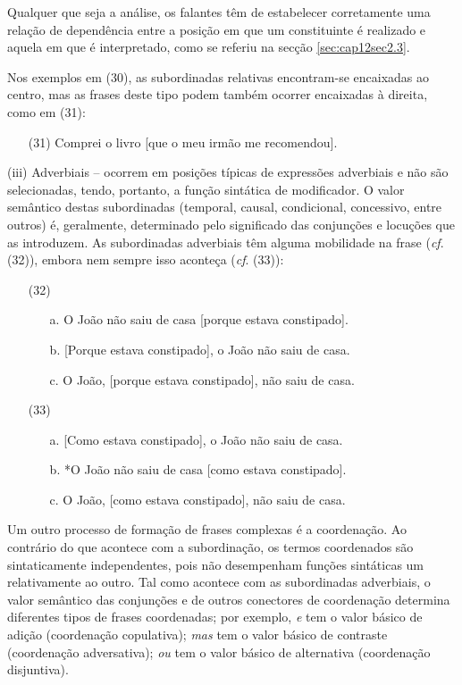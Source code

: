 \documentclass[output=paper,colorlinks,citecolor=brown,booklanguage=portuguese]{langscibook}
\begin{document}
Qualquer que seja a análise, os falantes têm de estabelecer corretamente uma relação de dependência entre a posição em que um constituinte é realizado e aquela em que é interpretado, como se referiu na secção \ref{sec:cap12sec2.3}. 

Nos exemplos em (30), as subordinadas relativas encontram-se encaixadas ao centro, mas as frases deste tipo podem também ocorrer encaixadas à direita, como em (31):

\begin{enumerate}[align=left]
    \item [(31)] Comprei o livro [que o meu irmão me recomendou].
\end{enumerate}

(iii) Adverbiais – ocorrem em posições típicas de expressões adverbiais e não são selecionadas, tendo, portanto, a função sintática de modificador. O valor semântico destas subordinadas (temporal, causal, condicional, concessivo, entre outros) é, geralmente, determinado pelo significado das conjunções e locuções que as introduzem. As subordinadas adverbiais têm alguma mobilidade na frase (\emph{cf}. (32)), embora nem sempre isso aconteça (\emph{cf}. (33)):

\begin{enumerate}[align=left]
    \item [(32)]
    \begin{enumerate}
        \item [a.] O João não saiu de casa [porque estava constipado].
	\item[b.] [Porque estava constipado], o João não saiu de casa.
	\item[c.] O João, [porque estava constipado], não saiu de casa.
	\end{enumerate}
\item[(33)]
\begin{enumerate}
    \item[a.] [Como estava constipado], o João não saiu de casa.
	\item[b.] *O João não saiu de casa [como estava constipado].
	\item[c.] O João, [como estava constipado], não saiu de casa.
    \end{enumerate}
\end{enumerate}

Um outro processo de formação de frases complexas é a coordenação. Ao contrário do que acontece com a subordinação, os termos coordenados são sintaticamente independentes, pois não desempenham funções sintáticas um relativamente ao outro. Tal como acontece com as subordinadas adverbiais, o valor semântico das conjunções e de outros conectores de coordenação determina diferentes tipos de frases coordenadas; por exemplo, \emph{e} tem o valor básico de adição (coordenação copulativa); \emph{mas} tem o valor básico de contraste (coordenação adversativa); \emph{ou} tem o valor básico de alternativa (coordenação disjuntiva).
\end{document}
